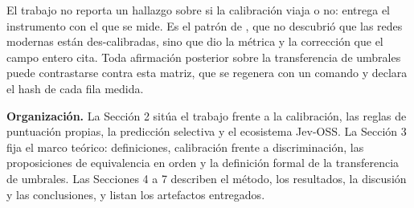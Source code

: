 El trabajo no reporta un hallazgo sobre si la calibración \guillemotleft viaja\guillemotright{} o no:
entrega el instrumento con el que se mide. Es el patrón de \cite{guo2017}, que no descubrió que las
redes modernas están des-calibradas, sino que dio la métrica y la corrección que el campo entero cita. Toda afirmación
posterior sobre la transferencia de umbrales puede contrastarse contra esta matriz, que se regenera con un
comando y declara el hash de cada fila medida.

\textbf{Organización.} La Sección 2 sitúa el trabajo frente a la calibración, las reglas de puntuación
propias, la predicción selectiva y el ecosistema Jev-OSS. La Sección 3 fija el marco teórico: definiciones,
calibración frente a discriminación, las proposiciones de equivalencia en orden y la definición formal de la
transferencia de umbrales. Las Secciones 4 a 7 describen el método, los resultados, la discusión y las
conclusiones, y listan los artefactos entregados.
